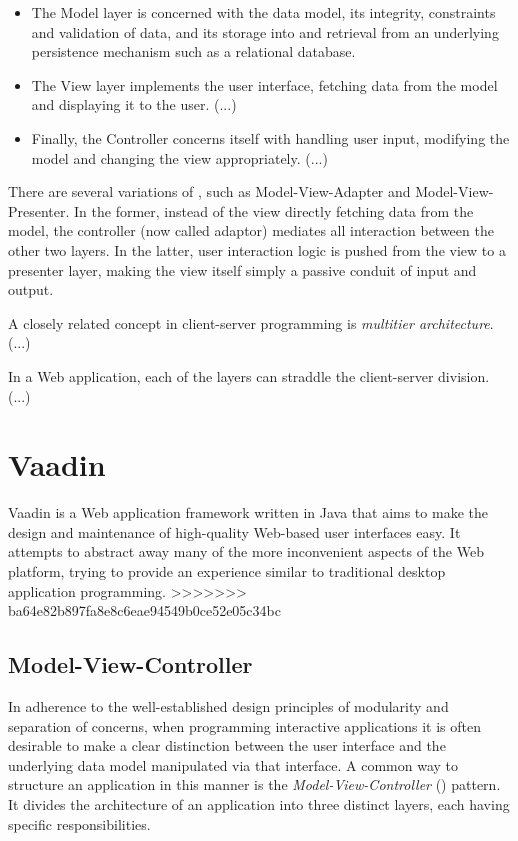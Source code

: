 \begin{itemize}

    \item The Model layer is concerned with the data model, its integrity, constraints and validation of data, and its storage into and retrieval from an underlying persistence mechanism such as a relational database.
    
    \item The View layer implements the user interface, fetching data from the model and displaying it to the user. (...)
    
    \item Finally, the Controller concerns itself with handling user input, modifying the model and changing the view appropriately. (...)

\end{itemize}





There are several variations of , such as Model-View-Adapter and Model-View-Presenter. In the former, instead of the view directly fetching data from the model, the controller (now called adaptor) mediates all interaction between the other two layers. In the latter, user interaction logic is pushed from the view to a presenter layer, making the view itself simply a passive conduit of input and output.

A closely related concept in client-server programming is \emph{multitier architecture}. (...)

In a Web application, each of the layers can straddle the client-server division. (...)

\section{Vaadin}

Vaadin is a Web application framework written in Java that aims to make the design and maintenance of high-quality Web-based user interfaces easy. It attempts to abstract away many of the more inconvenient aspects of the Web platform, trying to provide an experience similar to traditional desktop application programming.
>>>>>>> ba64e82b897fa8e8c6eae94549b0ce52e05c34bc

\subsection{Model-View-Controller}

In adherence to the well-established design principles of modularity and separation of concerns, when programming interactive applications it is often desirable to make a clear distinction between the user interface and the underlying data model manipulated via that interface. A common way to structure an application in this manner is the \emph{Model-View-Controller} () pattern. It divides the architecture of an application into three distinct layers, each having specific responsibilities.

